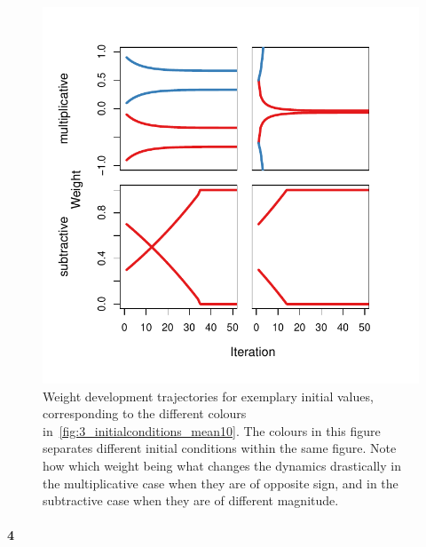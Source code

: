 \documentclass[10pt]{article}\usepackage[]{graphicx}\usepackage[]{color}
\makeatletter
\def\maxwidth{ %
  \ifdim\Gin@nat@width>\linewidth
    \linewidth
  \else
    \Gin@nat@width
  \fi
}
\theoremstyle{plain}
\makeatother
\begin{document}
\begin{multicols*}{2}
\begin{Schunk}
\begin{figure}[H]

{\centering \includegraphics[width=\maxwidth]{../figures/twocolumn-3_weight_devel-1} 

}

\caption{Weight development trajectories for exemplary initial values, corresponding to the different colours in~\cref{fig:3_initialconditions_mean10}. The colours in this figure separates different initial conditions within the same figure. Note how which weight being what changes the dynamics drastically in the multiplicative case when they are of opposite sign, and in the subtractive case when they are of different magnitude.}\label{fig:3_weight_devel}
\end{figure}
\end{Schunk}


\paragraph*{4}




\begin{Schunk}
\begin{figure}[H]


\end{figure}
\end{Schunk}
\end{multicols*}
\end{document}
